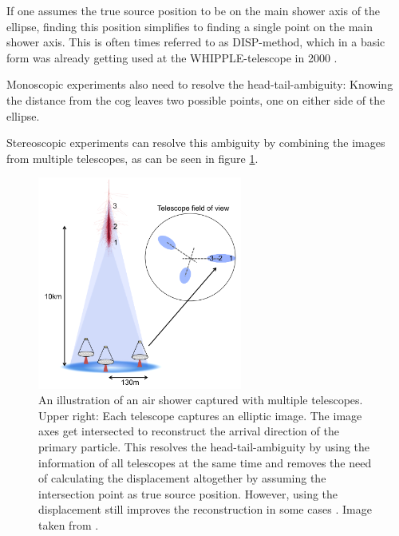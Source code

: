 If one assumes the true source position to be on the main shower axis of the ellipse,
finding this position simplifies to finding a single point on the main shower axis.
This is often times referred to as DISP-method,
which in a basic form was already getting used at 
the WHIPPLE-telescope in 2000 \cite{Lessard:2000yf}.

Monoscopic experiments also need to resolve the head-tail-ambiguity:
Knowing the distance from the cog leaves two possible points, one on either side 
of the ellipse.

Stereoscopic experiments can resolve this ambiguity by combining the images from 
multiple telescopes, as can be seen in figure \ref{fig:stereo_shower}.

\begin{figure}
	\centering
	\includegraphics[width=0.6\textwidth]{images/stereo_shower.png}
	\caption{An illustration of an air shower captured with multiple telescopes.
		Upper right: Each telescope captures an elliptic image.
		The image axes get intersected to reconstruct the arrival direction
		of the primary particle. This resolves the head-tail-ambiguity
		by using the information of all telescopes at the same time
		and removes the need of calculating the displacement altogether by
		assuming the intersection point as true source position.
		However, using the displacement still improves the reconstruction 
		in some cases \cite{some magic paper states that }.
	    Image taken from \cite{holder2015atmospheric}.}
	\label{fig:stereo_shower}
\end{figure}

